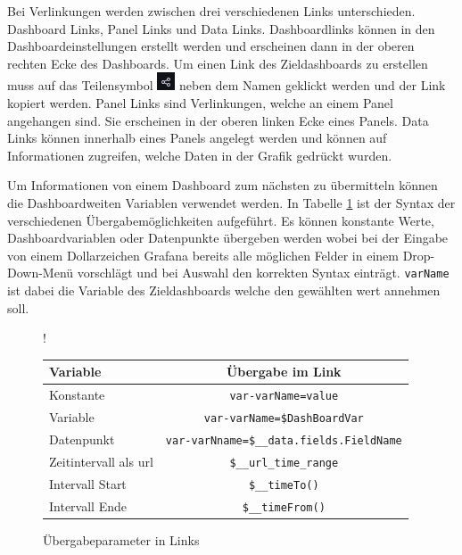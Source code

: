 \documentclass[a4paper, 12pt, oneside]{scrbook}
\begin{document}
			\noindent Bei Verlinkungen werden zwischen drei verschiedenen Links unterschieden. Dashboard Links, Panel Links und Data Links. Dashboardlinks können in den Dashboardeinstellungen erstellt werden und erscheinen dann in der oberen rechten Ecke des Dashboards. Um einen Link des Zieldashboards zu erstellen muss auf das Teilensymbol \includegraphics{res/teilensymbol.png} neben dem Namen geklickt werden und der Link kopiert werden. Panel Links sind Verlinkungen, welche an einem Panel angehangen sind. Sie erscheinen in der oberen linken Ecke eines Panels. Data Links können innerhalb eines Panels angelegt werden und können auf Informationen zugreifen, welche Daten in der Grafik gedrückt wurden. 
			 
			\noindent Um Informationen von einem Dashboard zum nächsten zu übermitteln können die Dashboardweiten Variablen verwendet werden. In Tabelle \ref{tab:links} ist der Syntax der verschiedenen Übergabemöglichkeiten aufgeführt. Es können konstante Werte, Dashboardvariablen oder Datenpunkte übergeben werden wobei bei der Eingabe von einem Dollarzeichen Grafana bereits alle möglichen Felder in einem Drop-Down-Menü vorschlägt und bei Auswahl den korrekten Syntax einträgt. \texttt{varName} ist dabei die Variable des Zieldashboards welche den gewählten wert annehmen soll.
			 
			\begin{figure} [H]
				\centering
				\resizebox{\linewidth} {!} {
			 		\begin{tabular}[h]{|l|c|}
			 			\hline
			 			Variable & Übergabe im Link \\
			 			\hline
			 			Konstante & \texttt{var-varName=value} \\
			 			\hline
			 			Variable &  \texttt{var-varName=\${DashBoardVar}} \\
			 			\hline
			 			Datenpunkt &  \texttt{var-varNname=\${\_\_data.fields.FieldName}} \\
			 			\hline
			 			Zeitintervall als url &  \texttt{\${\_\_url\_time\_range}} \\
			 			Intervall Start& \texttt{\$\_\_timeTo()} \\
			 			Intervall Ende& \texttt{\$\_\_timeFrom()} \\
			 			\hline
			 		\end{tabular}
		 		}
		 		
			 	\caption{Übergabeparameter in Links}
			 	\label{tab:links}
			\end{figure}
		 
\end{document}
